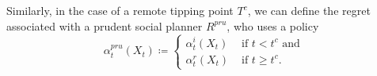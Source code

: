 \documentclass[../../main.tex]{subfiles}
\begin{document}
Similarly, in the case of a remote tipping point $T^c$, we can define the regret associated with a prudent social planner $R^{pru}$, who uses a policy \begin{equation}
    \alpha^{pru}_t(X_t) \coloneqq \begin{cases}
        \alpha_t^i(X_t) &\text{ if } t < t^c \text{ and } \\
        \alpha_t^r(X_t) &\text{ if } t \geq t^c.
    \end{cases}
\end{equation}
\end{document}
